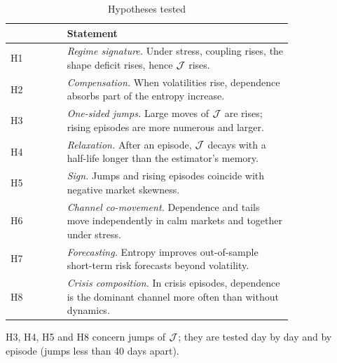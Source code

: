 \begin{table}[p]\centering\small
\caption{Hypotheses tested}\label{tab:hyp}
\begin{tabular}{@{}lp{0.8\linewidth}@{}}\toprule
& Statement \\\midrule
H1 & \emph{Regime signature.} Under stress, coupling rises, the shape deficit rises, hence $\mathcal{J}$ rises. \\
H2 & \emph{Compensation.} When volatilities rise, dependence absorbs part of the entropy increase. \\
H3 & \emph{One-sided jumps.} Large moves of $\mathcal{J}$ are rises; rising episodes are more numerous and larger. \\
H4 & \emph{Relaxation.} After an episode, $\mathcal{J}$ decays with a half-life longer than the estimator's memory. \\
H5 & \emph{Sign.} Jumps and rising episodes coincide with negative market skewness. \\
H6 & \emph{Channel co-movement.} Dependence and tails move independently in calm markets and together under stress. \\
H7 & \emph{Forecasting.} Entropy improves out-of-sample short-term risk forecasts beyond volatility. \\
H8 & \emph{Crisis composition.} In crisis episodes, dependence is the dominant channel more often than without dynamics. \\
\bottomrule\end{tabular}
\par\medskip\begin{minipage}{0.95\linewidth}\footnotesize
H3, H4, H5 and H8 concern jumps of $\mathcal{J}$; they are tested day by day and by episode (jumps less than 40 days apart).
\end{minipage}
\end{table}

